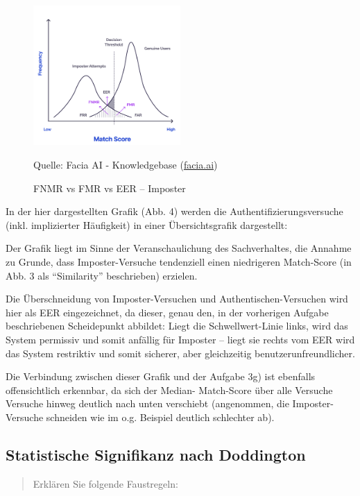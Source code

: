 \documentclass{article}
\newcommand{\annotation}[1]{
    \begin{quote}
    	\begin{textit}{#1}\end{textit}
    \end{quote}
}
\newcommand{\figuresource}[1]{
	\begin{center}Quelle: {#1}\end{center}
}
\begin{document}
\begin{figure}[ht]
	\includegraphics[width=0.5\textwidth]{assets/fnmr-fmr-eer-imposter}
	\centering
	\caption{FNMR vs FMR vs EER – Imposter}
	\figuresource{Facia AI - Knowledgebase
		(\href{https://facia.ai/knowledgebase/knowing-the-equal-error-rate-eer-in-biometrics/}{facia.ai})
	}
\end{figure}

In der hier dargestellten Grafik (Abb. 4) werden die Authentifizierungsversuche (inkl. implizierter Häufigkeit)
in einer Übersichtsgrafik dargestellt:

Der Grafik liegt im Sinne der Veranschaulichung des Sachverhaltes, die Annahme zu Grunde, dass Imposter-Versuche
tendenziell einen niedrigeren Match-Score (in Abb. 3 als ``Similarity'' beschrieben) erzielen.

Die Überschneidung von Imposter-Versuchen und Authentischen-Versuchen wird hier als EER eingezeichnet, da dieser,
genau den, in der vorherigen Aufgabe beschriebenen Scheidepunkt abbildet: Liegt die Schwellwert-Linie links, wird das 
System permissiv und somit anfällig für Imposter – liegt sie rechts vom EER wird das System restriktiv und somit sicherer,
aber gleichzeitig benutzerunfreundlicher.

Die Verbindung zwischen dieser Grafik und der Aufgabe 3g) ist ebenfalls offensichtlich erkennbar, da sich der Median-
Match-Score über alle Versuche Versuche hinweg deutlich nach unten verschiebt (angenommen, die Imposter-Versuche schneiden 
wie im o.g. Beispiel deutlich schlechter ab).

\newpage

\subsection{Statistische Signifikanz nach Doddington}

\annotation{Erklären Sie folgende Faustregeln:}
\end{document}
